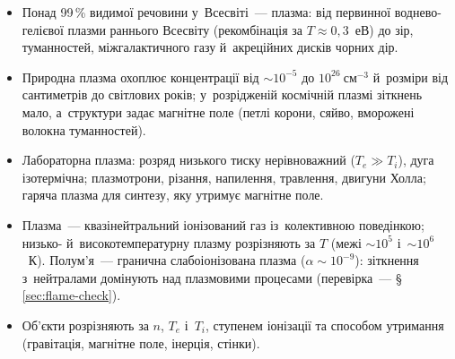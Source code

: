 \begin{Summary}
\begin{itemize}
\item Понад 99\,\% видимої речовини у~Всесвіті~--- плазма: від первинної воднево-гелієвої плазми раннього Всесвіту (рекомбінація за $T\approx0{,}3$~еВ) до зір, туманностей, міжгалактичного газу й~акреційних дисків чорних дір.
\item Природна плазма охоплює концентрації від $\sim10^{-5}$ до $10^{26}~\mathrm{см}^{-3}$ й~розміри від сантиметрів до світлових років; у~розрідженій космічній плазмі зіткнень мало, а~структури задає магнітне поле
(петлі корони, сяйво, вморожені волокна туманностей).
\item Лабораторна плазма: розряд низького тиску нерівноважний ($T_e\gg T_i$), дуга ізотермічна; плазмотрони, різання, напилення, травлення, двигуни Холла; гаряча плазма для синтезу, яку утримує магнітне поле.
\item Плазма~--- квазінейтральний іонізований газ із~колективною поведінкою; низько- й~високотемпературну плазму розрізняють за $T$ (межі $\sim10^5$ і~$\sim10^6$~К). Полум'я~--- гранична слабоіонізована плазма ($\alpha\sim10^{-9}$): зіткнення з~нейтралами домінують над плазмовими процесами (перевірка~--- §\,\ref{sec:flame-check}).
\item Об'єкти розрізняють за $n$, $T_e$ і~$T_i$, ступенем іонізації та способом утримання (гравітація, магнітне поле, інерція, стінки).
\end{itemize}
\end{Summary}

